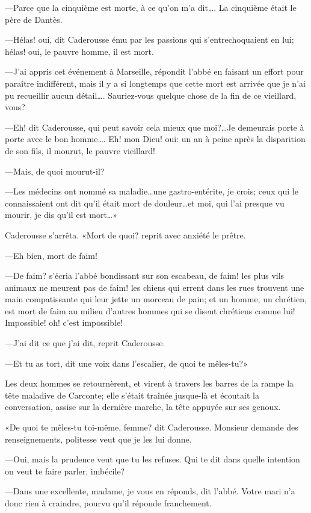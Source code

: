 —Parce que la cinquième est morte, à ce qu'on m'a dit\dots. La cinquième était le père de Dantès.

—Hélas! oui, dit Caderousse ému par les passions qui s'entrechoquaient en lui; hélas! oui, le pauvre homme, il est mort.

—J'ai appris cet événement à Marseille, répondit l'abbé en faisant un effort pour paraître indifférent, mais il y a si longtemps que cette mort est arrivée que je n'ai pu recueillir aucun détail\dots. Sauriez-vous quelque chose de la fin de ce vieillard, vous?

—Eh! dit Caderousse, qui peut savoir cela mieux que moi?\dots Je demeurais porte à porte avec le bon homme\dots. Eh! mon Dieu! oui: un an à peine après la disparition de son fils, il mourut, le pauvre vieillard!

—Mais, de quoi mourut-il?

—Les médecins ont nommé sa maladie\dots une gastro-entérite, je crois; ceux qui le connaissaient ont dit qu'il était mort de douleur\dots et moi, qui l'ai presque vu mourir, je dis qu'il est mort\dots»

Caderousse s'arrêta. «Mort de quoi? reprit avec anxiété le prêtre.

—Eh bien, mort de faim!

—De faim? s'écria l'abbé bondissant sur son escabeau, de faim! les plus vils animaux ne meurent pas de faim! les chiens qui errent dans les rues trouvent une main compatissante qui leur jette un morceau de pain; et un homme, un chrétien, est mort de faim au milieu d'autres hommes qui se disent chrétiens comme lui! Impossible! oh! c'est impossible!

—J'ai dit ce que j'ai dit, reprit Caderousse.

—Et tu as tort, dit une voix dans l'escalier, de quoi te mêles-tu?»

Les deux hommes se retournèrent, et virent à travers les barres de la rampe la tête maladive de Carconte; elle s'était traînée jusque-là et écoutait la conversation, assise sur la dernière marche, la tête appuyée sur ses genoux.

«De quoi te mêles-tu toi-même, femme? dit Caderousse. Monsieur demande des renseignements, politesse veut que je les lui donne.

—Oui, mais la prudence veut que tu les refuses. Qui te dit dans quelle intention on veut te faire parler, imbécile?

—Dans une excellente, madame, je vous en réponds, dit l'abbé. Votre mari n'a donc rien à craindre, pourvu qu'il réponde franchement.


